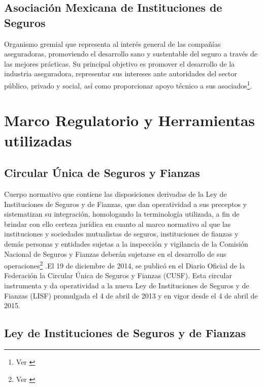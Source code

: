 \documentclass[11pt,twoside,openright,spanish]{report}
\numberwithin{equation}{chapter}
\numberwithin{figure}{chapter}
\numberwithin{table}{chapter}
\begin{document}
	
	\section{Asociación Mexicana de Instituciones de Seguros}
	
	Organismo gremial que representa al interés general de las compañías aseguradoras, promoviendo el desarrollo sano y sustentable del seguro a través de las mejores prácticas. Su principal objetivo es promover el desarrollo de la industria aseguradora, representar sus  intereses ante autoridades del sector público, privado y social, así como proporcionar apoyo técnico a sus asociados\footnote{Ver \citet{FAmis}}. 
	
	\chapter{Marco Regulatorio y Herramientas utilizadas}\label{tcyedb}
	
	\section{Circular Única de Seguros y Fianzas}

	
	Cuerpo normativo que contiene las disposiciones derivadas de la Ley de Instituciones de Seguros y de Fianzas, que dan operatividad a sus preceptos y sistematizan su integración, homologando la terminología utilizada, a fin de brindar con ello certeza jurídica en cuanto al marco normativo al que las instituciones y sociedades mutualistas de seguros, instituciones de fianzas y demás personas y entidades sujetas a la inspección y vigilancia de la Comisión Nacional de Seguros y Fianzas deberán sujetarse en el desarrollo de sus operaciones\footnote{Ver \citet{IDefCusf}} .El 19 de diciembre de 2014, se publicó en el Diario Oficial de la Federación la Circular Única de Seguros y Fianzas (CUSF). Esta circular instrumenta y da operatividad a la nueva Ley de Instituciones de Seguros y de Fianzas (LISF) promulgada el 4 de abril de 2013 y en vigor desde el 4 de abril de 2015. 
	
	\section{Ley de Instituciones de Seguros y de Fianzas}
\end{document}
